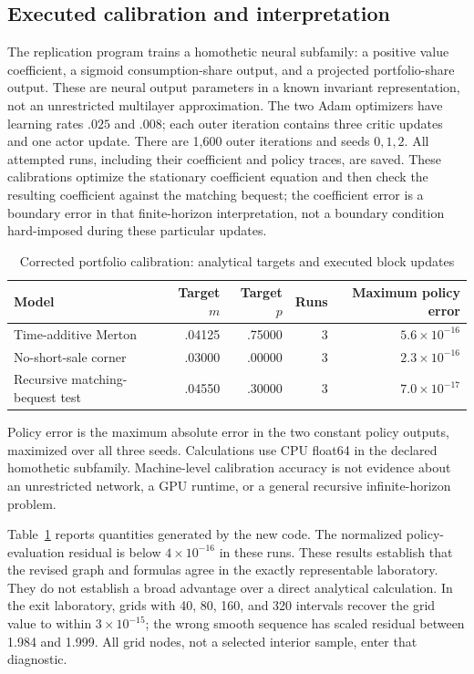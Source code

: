 \documentclass[ecta,draft]{econsocart}
\theoremstyle{definition}
\theoremstyle{remark}
\begin{document}
\subsection{Executed calibration and interpretation}
The replication program trains a homothetic neural subfamily: a positive value coefficient, a sigmoid consumption-share output, and a projected portfolio-share output. These are neural output parameters in a known invariant representation, not an unrestricted multilayer approximation. The two Adam optimizers have learning rates $.025$ and $.008$; each outer iteration contains three critic updates and one actor update. There are 1,600 outer iterations and seeds $0,1,2$. All attempted runs, including their coefficient and policy traces, are saved. These calibrations optimize the stationary coefficient equation and then check the resulting coefficient against the matching bequest; the coefficient error is a boundary error in that finite-horizon interpretation, not a boundary condition hard-imposed during these particular updates.

\begin{table}[t]
\centering
\caption{Corrected portfolio calibration: analytical targets and executed block updates}\label{tab:portfolio}
\begin{tabular}{lrrrr}
\toprule
Model & Target $m$ & Target $p$ & Runs & Maximum policy error\\
\midrule
Time-additive Merton & .04125 & .75000 & 3 & $5.6\times10^{-16}$\\
No-short-sale corner & .03000 & .00000 & 3 & $2.3\times10^{-16}$\\
Recursive matching-bequest test & .04550 & .30000 & 3 & $7.0\times10^{-17}$\\
\bottomrule
\end{tabular}
\par\smallskip\footnotesize Policy error is the maximum absolute error in the two constant policy outputs, maximized over all three seeds. Calculations use CPU float64 in the declared homothetic subfamily. Machine-level calibration accuracy is not evidence about an unrestricted network, a GPU runtime, or a general recursive infinite-horizon problem.
\end{table}

Table~\ref{tab:portfolio} reports quantities generated by the new code. The normalized policy-evaluation residual is below $4\times10^{-16}$ in these runs. These results establish that the revised graph and formulas agree in the exactly representable laboratory. They do not establish a broad advantage over a direct analytical calculation. In the exit laboratory, grids with 40, 80, 160, and 320 intervals recover the grid value to within $3\times10^{-15}$; the wrong smooth sequence has scaled residual between 1.984 and 1.999. All grid nodes, not a selected interior sample, enter that diagnostic.
\end{document}
